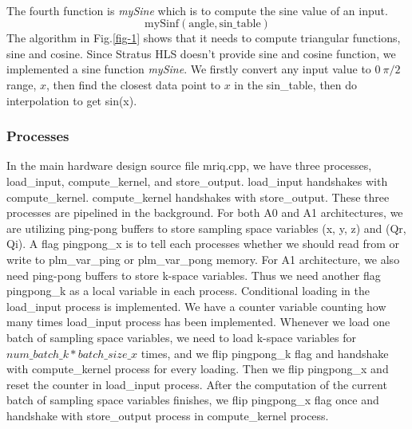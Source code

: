 \documentclass{sig-alternate}
\begin{document}
\\

The fourth function is \textit{mySine} which is to compute the sine value of an input.
$$\mathrm{mySinf(angle, sin\_table)}$$
The algorithm in Fig.\ref{fig-1} shows that it needs to compute triangular functions, sine and cosine. Since Stratus HLS doesn't provide sine and cosine function, we implemented a sine function \textit{mySine}. We firstly convert any input value to $0~\pi/2$ range, $x$, then find the closest data point to $x$ in the sin\_table, then do interpolation to get sin(x). 
\\

\subsubsection{Processes}
In the main hardware design source file mriq.cpp, we have three processes, load\_input, compute\_kernel, and store\_output. load\_input handshakes with compute\_kernel. compute\_kernel handshakes with store\_output. These three processes are pipelined in the background. For both A0 and A1 architectures, we are utilizing ping-pong buffers to store sampling space variables (x, y, z) and (Qr, Qi). A flag pingpong\_x is to tell each processes whether we should read from or write to plm\_var\_ping or plm\_var\_pong memory. For A1 architecture, we also need ping-pong buffers to store k-space variables. Thus we need another flag pingpong\_k as a local variable in each process. Conditional loading in the load\_input process is implemented. We have a counter variable counting how many times load\_input process has been implemented. Whenever we load one batch of sampling space variables, we need to load k-space variables for $num\_batch\_k * batch\_size\_x$ times, and we flip pingpong\_k flag and handshake with compute\_kernel process for every loading. Then we flip pingpong\_x and reset the counter in load\_input process. After the computation of the current batch of sampling space variables finishes, we flip pingpong\_x flag once and handshake with store\_output process in compute\_kernel process. \\
\end{document}
